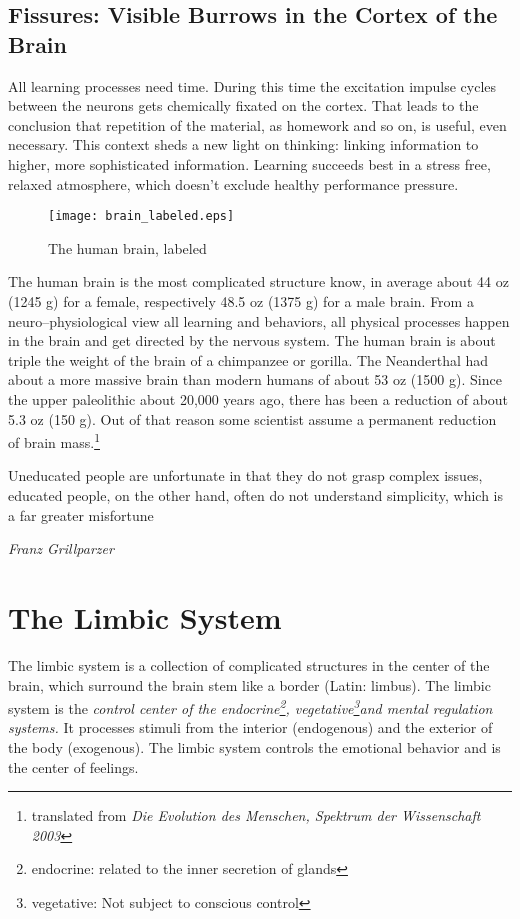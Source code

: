 \documentclass[../main.tex]{subfiles}
\begin{document}
\section{Fissures: Visible Burrows in the Cortex of the Brain}

	All learning processes need {time}. During this time the excitation impulse cycles between the neurons gets chemically fixated on the cortex.
	That leads to the conclusion that {repetition} of the material, as homework and so on, is useful, even necessary. 
	This context sheds a new light on {thinking}: {linking information} to higher, more sophisticated information.
	Learning succeeds best in a stress free, {relaxed atmosphere}, which doesn't exclude healthy performance pressure.

        \begin{figure}[htb]
          \centering
          \texttt{[image: brain\_labeled.eps]}
          \caption{The human brain, labeled~\cite{wclipart}}
        \end{figure}

        The human brain is the most complicated structure know, in average about 44 oz (1245 g) for a female, respectively 48.5 oz (1375 g) for a male brain.
        From a neuro--physiological view all learning and behaviors, all physical processes happen in the brain and get directed by the nervous system.
        The human brain is about triple the weight of the brain of a chimpanzee or gorilla. The Neanderthal had about a more massive brain than modern humans of about 53 oz (1500 g).
        Since the upper paleolithic about 20,000 years ago, there has been a reduction of about 5.3 oz (150 g).
        Out of that reason some scientist assume a permanent reduction of brain mass.\footnote{translated from \textit{Die Evolution des Menschen, Spektrum der Wissenschaft 2003}}

        \setlength{}
        
        \epigraph{Uneducated people are unfortunate in that they do not grasp complex issues, educated people, on the other hand, often do not understand simplicity, which is a far greater misfortune}{\textit{Franz Grillparzer}}
        \setlength{}

        \chapter{The Limbic System}

        The limbic system  is a collection of complicated structures in the center of the brain, which surround the brain stem like a border (Latin: limbus).
        The limbic system is the \emph{control center of the endocrine\footnote{endocrine: related to the inner secretion of glands}, vegetative\footnote{vegetative: Not subject to conscious control}and mental regulation systems.}
        It processes stimuli from the interior (endogenous) and the exterior of the body (exogenous).
        The limbic system controls the emotional behavior and is the center of feelings.
        
\end{document}

